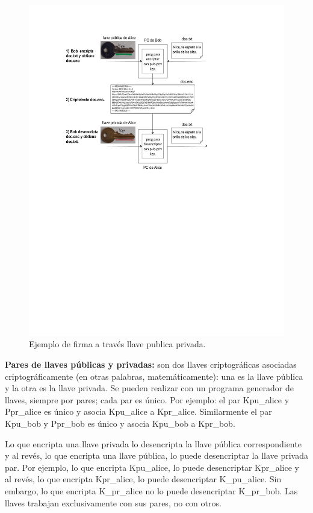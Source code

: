 \documentclass[12pt]{report} %
\begin{document}
\begin{itemize}
\begin{figure}
\centering
\includegraphics[width=0.85\columnwidth]{imagenes/llavespublicaprivada.pdf}
\caption{Ejemplo de firma a través llave publica privada.}
\label{Fig. llavespublicaprivada}
\end{figure} 

\textbf{Pares de llaves públicas y privadas:} son dos llaves criptográficas asociadas criptográficamente (en otras palabras, matemáticamente): una es la llave pública y la otra es la llave privada. Se pueden realizar con un programa generador de llaves, siempre por pares; cada par es único. Por ejemplo: el par Kpu\_alice y Ppr\_alice es único y asocia Kpu\_alice a Kpr\_alice. Similarmente el par Kpu\_bob y Ppr\_bob es único y asocia Kpu\_bob a Kpr\_bob.

Lo que encripta una llave privada lo desencripta la llave pública correspondiente y al revés, lo que encripta una llave pública, lo puede desencriptar la llave privada par. Por ejemplo, lo que encripta Kpu\_alice, lo puede desencriptar Kpr\_alice y al revés, lo que encripta Kpr\_alice, lo puede desencriptar K\_pu\_alice.  Sin embargo, lo que encripta K\_pr\_alice no lo puede desencriptar K\_pr\_bob. Las llaves trabajan exclusivamente con sus pares, no con otros.


\end{itemize}
\end{document}
